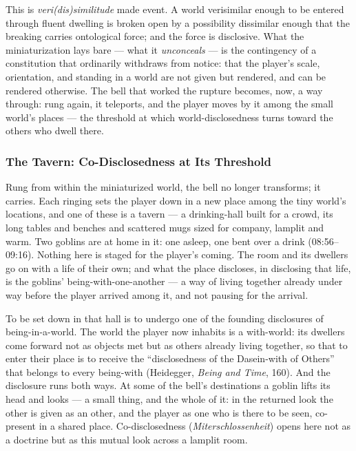 This is \textit{veri(dis)similitude} made event. A world verisimilar enough to be entered through fluent dwelling is broken open by a possibility dissimilar enough that the breaking carries ontological force; and the force is disclosive. What the miniaturization lays bare — what it \textit{unconceals} — is the contingency of a constitution that ordinarily withdraws from notice: that the player's scale, orientation, and standing in a world are not given but rendered, and can be rendered otherwise. The bell that worked the rupture becomes, now, a way through: rung again, it teleports, and the player moves by it among the small world's places — the threshold at which world-disclosedness turns toward the others who dwell there.

\subsubsection*{The Tavern: Co-Disclosedness at Its Threshold}

Rung from within the miniaturized world, the bell no longer transforms; it carries. Each ringing sets the player down in a new place among the tiny world's locations, and one of these is a tavern — a drinking-hall built for a crowd, its long tables and benches and scattered mugs sized for company, lamplit and warm. Two goblins are at home in it: one asleep, one bent over a drink (08:56–09:16). Nothing here is staged for the player's coming. The room and its dwellers go on with a life of their own; and what the place discloses, in disclosing that life, is the goblins' being-with-one-another — a way of living together already under way before the player arrived among it, and not pausing for the arrival.

To be set down in that hall is to undergo one of the founding disclosures of being-in-a-world. The world the player now inhabits is a with-world: its dwellers come forward not as objects met but as others already living together, so that to enter their place is to receive the ``disclosedness of the Dasein-with of Others'' that belongs to every being-with (Heidegger, \textit{Being and Time}, 160). And the disclosure runs both ways. At some of the bell's destinations a goblin lifts its head and looks — a small thing, and the whole of it: in the returned look the other is given as an other, and the player as one who is there to be seen, co-present in a shared place. Co-disclosedness (\textit{Miterschlossenheit}) opens here not as a doctrine but as this mutual look across a lamplit room.

